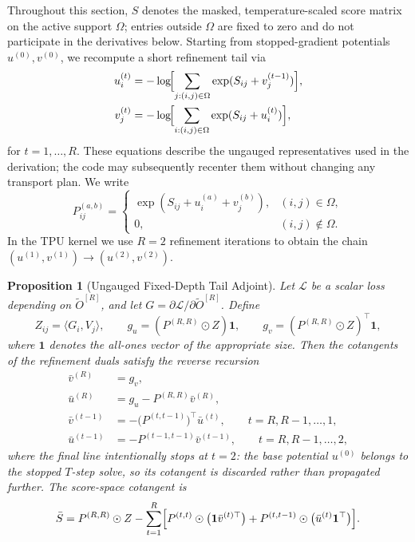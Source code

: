\documentclass{article}
\newtheorem{proposition}{Proposition}
\begin{document}
Throughout this section, $S$ denotes the masked, temperature-scaled score matrix on the active support $\Omega$; entries outside $\Omega$ are fixed to zero and do not participate in the derivatives below. Starting from stopped-gradient potentials $u^{(0)}, v^{(0)}$, we recompute a short refinement tail via
\begin{align}
    u^{(t)}_i &= -\log\!\Bigl[\sum_{j:(i,j)\in\Omega} \exp(S_{ij} + v^{(t-1)}_j)\Bigr], \\
    v^{(t)}_j &= -\log\!\Bigl[\sum_{i:(i,j)\in\Omega} \exp(S_{ij} + u^{(t)}_i)\Bigr],
\end{align}
for $t = 1,\dots,R$. These equations describe the ungauged representatives used in the derivation; the code may subsequently recenter them without changing any transport plan. We write
\[
P^{(a,b)}_{ij} =
\begin{cases}
\exp(S_{ij} + u^{(a)}_i + v^{(b)}_j), & (i,j)\in\Omega, \\
0, & (i,j)\notin\Omega.
\end{cases}
\]
In the TPU kernel we use $R=2$ refinement iterations to obtain the chain $(u^{(1)}, v^{(1)}) \to (u^{(2)}, v^{(2)})$.

\begin{proposition}[Ungauged Fixed-Depth Tail Adjoint]\label{prop:tail_adjoint}
Let $\mathcal{L}$ be a scalar loss depending on $\widetilde{O}^{[R]}$, and let $G = \partial \mathcal{L} / \partial \widetilde{O}^{[R]}$. Define
\[
Z_{ij} = \langle G_i, V_j \rangle,
\qquad
g_u = (P^{(R,R)} \odot Z)\mathbf{1},
\qquad
g_v = (P^{(R,R)} \odot Z)^\top \mathbf{1},
\]
where $\mathbf{1}$ denotes the all-ones vector of the appropriate size. Then the cotangents of the refinement duals satisfy the reverse recursion
\begin{align}
    \bar v^{(R)} &= g_v, \\
    \bar u^{(R)} &= g_u - P^{(R,R)} \bar v^{(R)}, \\
    \bar v^{(t-1)} &= -\bigl(P^{(t,t-1)}\bigr)^\top \bar u^{(t)}, \qquad t=R,R-1,\dots,1, \\
    \bar u^{(t-1)} &= -P^{(t-1,t-1)} \bar v^{(t-1)}, \qquad t=R,R-1,\dots,2,
\end{align}
where the final line intentionally stops at $t=2$: the base potential $u^{(0)}$ belongs to the stopped $T$-step solve, so its cotangent is discarded rather than propagated further. The score-space cotangent is
\begin{equation}
\label{eq:generic_score_vjp}
    \bar S
    =
    P^{(R,R)} \odot Z
    -
    \sum_{t=1}^R
    \Bigl[
        P^{(t,t)} \odot \bigl(\mathbf{1}\bar v^{(t)\top}\bigr)
        +
        P^{(t,t-1)} \odot \bigl(\bar u^{(t)}\mathbf{1}^\top\bigr)
    \Bigr].
\end{equation}
\end{proposition}
\end{document}
